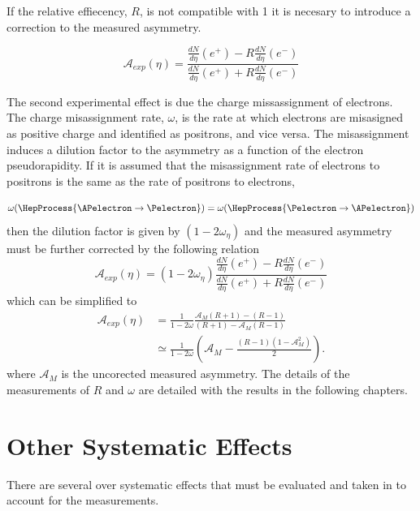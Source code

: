 If the relative effiecency, $R$, is not compatible with 1 it is necesary to
introduce a correction to the measured asymmetry.

\begin{equation}
\mathcal{A}_{exp}(\eta) = \frac{
                     \frac{dN}{d\eta}(e^+)- R\frac{dN}{d\eta}(e^-)
                     }
                     {
                     \frac{dN}{d\eta}(e^+)+ R\frac{dN}{d\eta}(e^-)
                     }
\end{equation}

The second experimental effect is due the charge missassignment of electrons.
The charge misassignment rate, $\omega$, is the rate at which electrons are
misasigned as positive charge and identified as positrons, and vice versa. The
misassignment induces a dilution factor to the asymmetry as a function of the
electron pseudorapidity. If it is assumed that the misassignment rate of
electrons to positrons is the same as the rate of positrons to electrons, \ie 

\begin{equation}
  \omega( \HepProcess{\APelectron \to \Pelectron} ) =
  \omega( \HepProcess{\Pelectron \to \APelectron} )
\end{equation}
then the dilution factor is given by $(1-2\omega_\eta)$ and the measured
asymmetry must be further corrected by the following relation
\begin{equation}
  \mathcal{A}_{exp}(\eta) = (1-2\omega_\eta)
                \frac{
                    \frac{dN}{d\eta}(e^+)-
                    R\frac{dN}{d\eta}(e^-)
                }
                {
                    \frac{dN}{d\eta}(e^+)+
                    R\frac{dN}{d\eta}(e^-)
                }
\end{equation}
which can be simplified to
\begin{align*}
  \mathcal{A}_{exp}(\eta) 
  &=
  \frac{1}{1-2\omega}
  \frac{ \mathcal{A}_M\left(R+1\right) - \left(R-1\right)}
       {\left(R+1\right)-\mathcal{A}_M \left(R-1\right)}\\
  &\simeq 
  \frac{1}{1-2\omega}
  \left(\mathcal{A}_M
 -\frac{\left(R-1\right)\left(1-\mathcal{A}_M^2\right)}{2}\right).
\end{align*}
where $\mathcal{A}_M$ is the uncorected measured asymmetry. The details of the
measurements of $R$ and $\omega$  are detailed with the results in the following
chapters.

\section{Other Systematic Effects}
There are several over systematic effects that must be evaluated and taken in to
account for the measurements.

